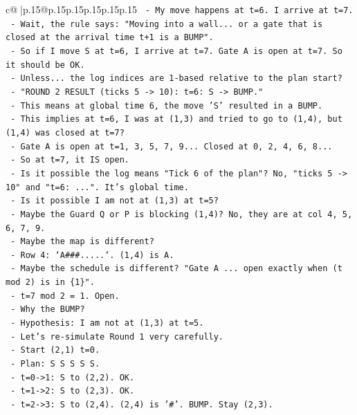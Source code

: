 \documentclass{article}
\begin{document}
{\begin{supertabular}{c@{$\;$}|p{.15\linewidth}@{}p{.15\linewidth}p{.15\linewidth}p{.15\linewidth}p{.15\linewidth}p{.15\linewidth}}
{{{\texttt{  {-} My move happens at t=6. I arrive at t=7.} \\
\texttt{  {-} Wait, the rule says: "Moving into a wall... or a gate that is closed at the arrival time t+1 is a BUMP".} \\
\texttt{  {-} So if I move S at t=6, I arrive at t=7. Gate A is open at t=7. So it should be OK.} \\
\texttt{  {-} Unless... the log indices are 1{-}based relative to the plan start?} \\
\texttt{  {-} "ROUND 2 RESULT (ticks 5 {-}> 10): t=6: S {-}> BUMP."} \\
\texttt{  {-} This means at global time 6, the move 'S' resulted in a BUMP.} \\
\texttt{  {-} This implies at t=6, I was at (1,3) and tried to go to (1,4), but (1,4) was closed at t=7?} \\
\texttt{  {-} Gate A is open at t=1, 3, 5, 7, 9... Closed at 0, 2, 4, 6, 8...} \\
\texttt{  {-} So at t=7, it IS open.} \\
\texttt{  {-} Is it possible the log means "Tick 6 of the plan"? No, "ticks 5 {-}> 10" and "t=6: ...". It's global time.} \\
\texttt{  {-} Is it possible I am not at (1,3) at t=5?} \\
\texttt{  {-} Maybe the Guard Q or P is blocking (1,4)? No, they are at col 4, 5, 6, 7, 9.} \\
\texttt{  {-} Maybe the map is different?} \\
\texttt{  {-} Row 4: `A\#\#\#.....`. (1,4) is A.} \\
\texttt{  {-} Maybe the schedule is different? "Gate A ... open exactly when (t mod 2) is in \{1\}".} \\
\texttt{  {-} t=7 mod 2 = 1. Open.} \\
\texttt{  {-} Why the BUMP?} \\
\texttt{  {-} Hypothesis: I am not at (1,3) at t=5.} \\
\texttt{  {-} Let's re{-}simulate Round 1 very carefully.} \\
\texttt{  {-} Start (2,1) t=0.} \\
\texttt{  {-} Plan: S S S S S.} \\
\texttt{  {-} t=0{-}>1: S to (2,2). OK.} \\
\texttt{  {-} t=1{-}>2: S to (2,3). OK.} \\
\texttt{  {-} t=2{-}>3: S to (2,4). (2,4) is '\#'. BUMP. Stay (2,3).} \\
}}}
\end{supertabular}}
\end{document}
